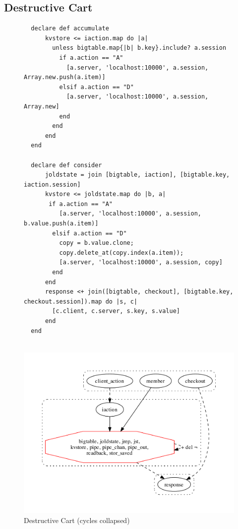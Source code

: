 \subsection{Destructive Cart}

\begin{figure}[t]
\begin{tiny}
\begin{verbatim}
  declare def accumulate
      kvstore <= iaction.map do |a| 
        unless bigtable.map{|b| b.key}.include? a.session
          if a.action == "A"
            [a.server, 'localhost:10000', a.session, Array.new.push(a.item)]
          elsif a.action == "D"
            [a.server, 'localhost:10000', a.session, Array.new]
          end
        end
      end
  end

  declare def consider
      joldstate = join [bigtable, iaction], [bigtable.key, iaction.session]
      kvstore <= joldstate.map do |b, a| 
       if a.action == "A"
          [a.server, 'localhost:10000', a.session, b.value.push(a.item)]
        elsif a.action == "D"
          copy = b.value.clone;
          copy.delete_at(copy.index(a.item));
          [a.server, 'localhost:10000', a.session, copy]
        end
      end
      response <+ join([bigtable, checkout], [bigtable.key, checkout.session]).map do |s, c|
        [c.client, c.server, s.key, s.value]
      end
  end


\end{verbatim}
\end{tiny}
\centering
\includegraphics[width=0.9\linewidth]{fig/ImperativeCartServer_gvoutput.pdf}

\caption{Destructive Cart (cycles collapsed)}
\label{fig:pdg-destructive}
\end{figure}


